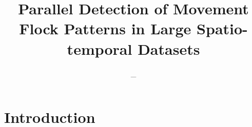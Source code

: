 \documentclass[12pt]{scrartcl}
\title{Parallel Detection of Movement Flock Patterns in Large Spatio-temporal Datasets}
\author{_}
\begin{document}
\maketitle
 
\section{Introduction}
\end{document}
